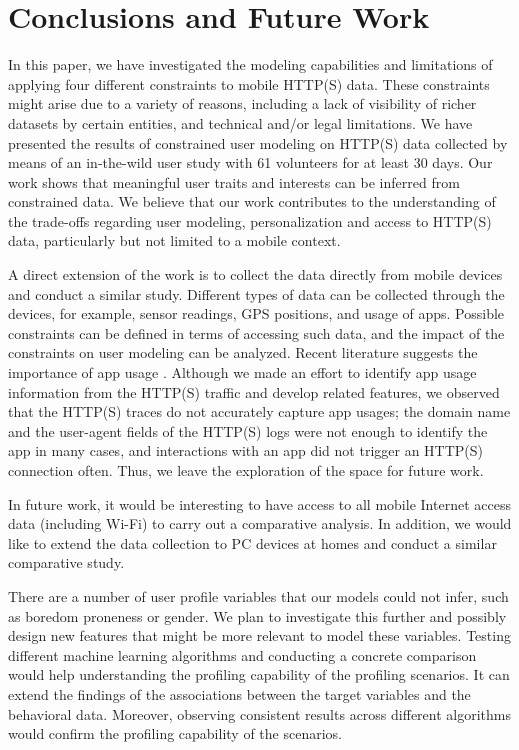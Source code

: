 \section{Conclusions and Future Work}
In this paper, we have investigated the modeling capabilities and limitations of applying four different constraints to mobile HTTP(S) data. These constraints might arise due to a variety of reasons, including a lack of visibility of richer datasets by certain entities, and technical and/or legal limitations. We have presented the results of constrained user modeling on HTTP(S) data collected by means of an in-the-wild user study with 61 volunteers for at least 30 days. Our work shows that meaningful user traits and interests can be inferred from constrained data. We believe that our work contributes to the understanding of the trade-offs regarding user modeling, personalization and access to HTTP(S) data, particularly but not limited to a mobile context.

A direct extension of the work is to collect the data directly from mobile devices and conduct a similar study. Different types of data can be collected through the devices, for example, sensor readings, GPS positions, and usage of apps. Possible constraints can be defined in terms of accessing such data, and the impact of the constraints on user modeling can be analyzed. Recent literature suggests the importance of app usage \cite{seneviratne2014predicting}. Although we made an effort to identify app usage information from the HTTP(S) traffic and develop related features, we observed that the HTTP(S) traces do not accurately capture app usages; the domain name and the user-agent fields of the HTTP(S) logs were not enough to identify the app in many cases, and interactions with an app did not trigger an HTTP(S) connection often. Thus, we leave the exploration of the space for future work. 

In future work, it would be interesting to have access to all mobile Internet access data (including Wi-Fi) to carry out a comparative analysis. In addition, we would like to extend the data collection to PC devices at homes and conduct a similar comparative study. 

There are a number of user profile variables that our models could not infer, such as boredom proneness or gender. We plan to investigate this further and possibly design new features that might be more relevant to model these variables. Testing different  machine learning algorithms and conducting a concrete comparison would help understanding the profiling capability of the profiling scenarios. It can extend the findings of the associations between the target variables and the behavioral data. Moreover, observing consistent results across different algorithms would confirm the profiling capability of the scenarios.

